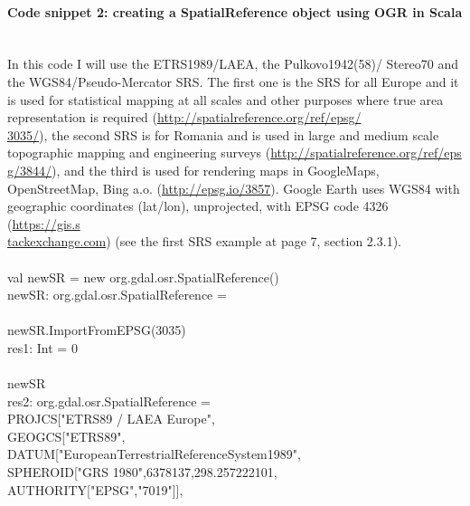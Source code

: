 \documentclass {article}
\begin{document}
\paragraph {Code snippet 2: creating a SpatialReference object using OGR in Scala}
\\
In this code I will use the ETRS1989/LAEA, the Pulkovo1942(58)/ Stereo70 and the WGS84/Pseudo-Mercator SRS. The first one is the SRS for all Europe and it is used for statistical mapping at all scales and other purposes where true area representation is required (\href{http://spatialreference.org/ref/epsg/3035/}{http://spatialreference.org/ref/epsg/\\3035/}), the second SRS is for Romania and is used in large and medium scale topographic mapping and engineering surveys (\href{http://spatialreference.org/ref/epsg/3844/}{http://spatialreference.org/ref/eps\\g/3844/}), and the third is used for rendering maps in GoogleMaps, OpenStreetMap, Bing a.o. (\href{http://epsg.io/3857}{http://epsg.io/3857}). 
Google Earth uses WGS84 with geographic coordinates (lat/lon), unprojected, with EPSG code 4326 (\href{https://gis.stackexchange.com}{https://gis.s\\tackexchange.com}) (see the first SRS example at page 7, section 2.3.1). 
\\
\\
val newSR = new org.gdal.osr.SpatialReference()\\
newSR: org.gdal.osr.SpatialReference = \\
\\
newSR.ImportFromEPSG(3035) \\
res1: Int = 0 \\
\\
newSR \\
res2: org.gdal.osr.SpatialReference = \\
PROJCS["ETRS89 / LAEA Europe",\\
\hspace*{2mm} GEOGCS["ETRS89",\\
\hspace*{4mm} DATUM["European\underline{\space}Terrestrial\underline{\space}Reference\underline{\space}System\underline{\space}1989",\\
\hspace*{6mm} SPHEROID["GRS 1980",6378137,298.257222101,\\
\hspace*{8mm} AUTHORITY["EPSG","7019"]],\\
\end{document}
